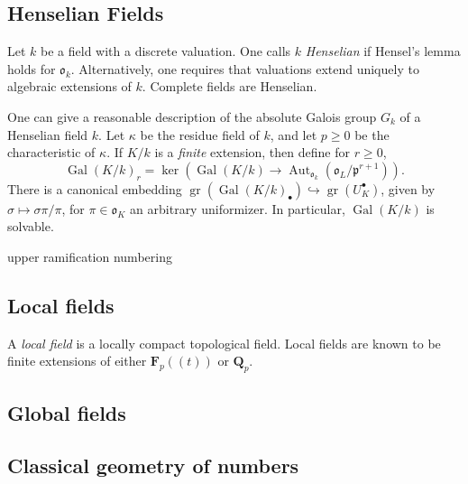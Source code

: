 \documentclass{article}
\DeclareMathOperator{\automorphism}{Aut}
\DeclareMathOperator{\galois}{Gal}
\DeclareMathOperator{\graded}{gr}
\newcommand{\dF}{\mathbf{F}}
\newcommand{\dQ}{\mathbf{Q}}
\newcommand{\fp}{\mathfrak{p}}
\newcommand{\fo}{\mathfrak{o}}
\newcommand{\laurent}[1]{(\! ({#1} )\! )}
\theoremstyle{definition}
\begin{document}
\subsection{Henselian Fields}

Let $k$ be a field with a discrete valuation. One calls $k$ \emph{Henselian} 
if Hensel's lemma holds for $\fo_k$. Alternatively, one requires that 
valuations extend uniquely to algebraic extensions of $k$. Complete fields 
are Henselian. 

One can give a reasonable description of the absolute Galois group $G_k$ of a 
Henselian field $k$. Let $\kappa$ be the residue field of $k$, and let 
$p\geqslant 0$ be the characteristic of $\kappa$. If $K/k$ is a \emph{finite} 
extension, then define for $r\geqslant 0$, 
\[
  \galois(K/k)_r = \ker\left(\galois(K/k) \to \automorphism_{\fo_k}(\fo_L/\fp^{r+1})\right) .
\]
There is a canonical embedding 
$\graded(\galois(K/k)_\bullet)\hookrightarrow \graded(U_K^\bullet)$, 
given by $\sigma\mapsto \sigma \pi/\pi$, for $\pi\in \fo_K$ an arbitrary 
uniformizer. In particular, $\galois(K/k)$ is solvable. 

upper ramification numbering





\subsection{Local fields}

A \emph{local field} is a locally compact topological field. Local fields are 
known to be finite extensions of either $\dF_p\laurent t$ or $\dQ_p$. 





\subsection{Global fields}


\subsection{Classical geometry of numbers}
\end{document}
